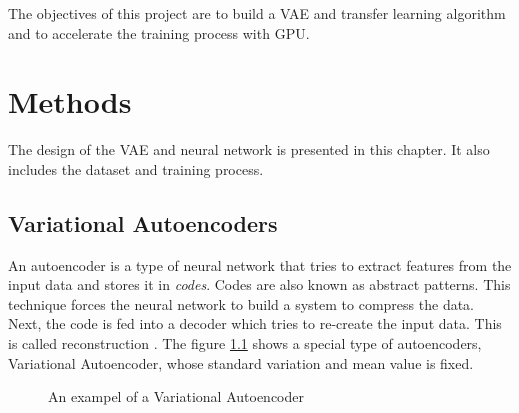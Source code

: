 \documentclass[11pt,a4paper]{report}
\begin{document}
The objectives of this project are to build a VAE and transfer learning algorithm and to accelerate the training process with GPU.


\chapter{Methods}
\label{cap:method}

The design of the VAE and neural network is presented in this chapter. It also includes the dataset and training process.

\section{Variational Autoencoders}
\label{sec:vae}

An autoencoder is a type of neural network that tries to extract features from the input data and stores it in \textit{codes}. Codes are also known as abstract patterns. This technique forces the neural network to build a system to compress the data. Next, the code is fed into a decoder which tries to re-create the input data. This is called reconstruction \cite{kingma2013auto}. The figure \ref{fig:vae} shows a special type of autoencoders, Variational Autoencoder, whose standard variation and mean value is fixed.

\begin{figure}[h!]
\noindent{}
\caption{An exampel of a Variational Autoencoder}
  \label{fig:vae}
\end{figure}
\end{document}

